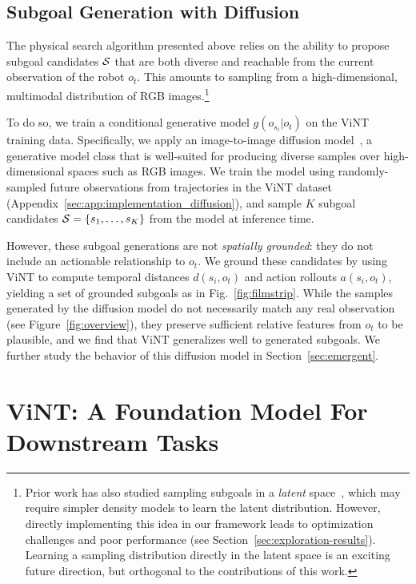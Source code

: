 \documentclass{article}
\newcommand{\ModelName}{ViNT\xspace}
\begin{document}
\subsection{Subgoal Generation with Diffusion}
\label{sec:method_diffusion}


The physical search algorithm presented above relies on the ability to propose subgoal candidates ${\mathcal{S}}$ that are both diverse and reachable from the current observation of the robot $o_t$. This amounts to sampling from a high-dimensional, multimodal distribution of RGB images.\footnote{Prior work has also studied sampling subgoals in a \emph{latent} space~\cite{shah2021rapid}, which may require simpler density models to learn the latent distribution. However, directly implementing this idea in our framework leads to optimization challenges and poor performance (see Section~\ref{sec:exploration-results}). Learning a sampling distribution directly in the latent space \cite{rombach2022highresolution} is an exciting future direction, but orthogonal to the contributions of this work.}

To do so, we train a conditional generative model $g(o_{s_i} | o_t)$ on the \ModelName training data. Specifically, we apply an image-to-image diffusion model~\cite{ho2020denoising, saharia2022palette}, a generative model class that is well-suited for producing diverse samples over high-dimensional spaces such as RGB images. We train the model using randomly-sampled future observations from trajectories in the \ModelName dataset (Appendix~\ref{sec:app:implementation_diffusion}), and sample $K$ subgoal candidates ${\mathcal{S}} = \{s_1, \ldots, s_K\}$ from the model at inference time. 

However, these subgoal generations are not \emph{spatially grounded}: they do not include an actionable relationship to $o_t$. We ground these candidates by using \ModelName to compute temporal distances $d(s_i, o_t)$ and action rollouts $a(s_i, o_t)$, yielding a set of grounded subgoals as in Fig.~\ref{fig:filmstrip}. While the samples generated by the diffusion model do not necessarily match any real observation (see Figure~\ref{fig:overview}),
they preserve sufficient relative features from $o_t$ to be plausible, and we find that \ModelName generalizes well to generated subgoals. We further study the behavior of this diffusion model in Section~\ref{sec:emergent}.


\section{\ModelName: A Foundation Model For Downstream Tasks}
\label{sec:method_finetuning}
\end{document}
